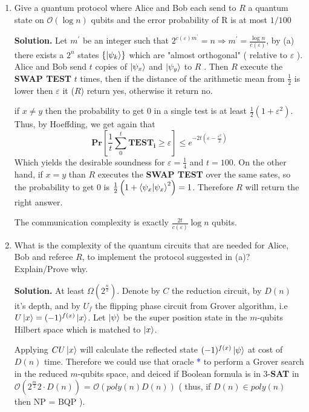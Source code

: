 \documentclass{article}
\newcommand{\onotation}[1]{\(\mathcal{O} \left( {#1}  \right) \)}
\newcommand{\ona}[1]{\onotation{#1}}
\begin{document}
\begin{enumerate}
    \item Give a quantum protocol where Alice and Bob each send to \(R\) a quantum state on \ona{ \log n}  qubits and the error probability of R is at most \( 1/100\) 
    
    
    \textbf{Solution.} Let \(m^\prime\) be an integer such that \( 2^{c(\varepsilon)m^\prime} = n \Rightarrow m^\prime = \frac{\log n}{c(\varepsilon)}\), by (a) there exists a \(2^n\) states \( \{ \ket{\psi_k} \} \) which are "almost orthogonal" ( relative to \(\varepsilon\) ). Alice and Bob send \(t\) copies of \( \ket{\psi_x} \) and \( \ket{\psi_y} \) to \(R\) . Then \(R\) execute the \textbf{SWAP TEST} \(t\) times, then if the distance of the arithmetic mean from \( \frac{1}{2} \) is lower then \(\varepsilon \) it (\(R\)) return yes, otherwise it return no.
    
    if \( x \neq y\) then the probability to get 0 in a single test is at least \( \frac{1}{2} \left( 1+ \varepsilon^2\right) \). Thus, by Hoeffding, we get again that \[ \mathbf{Pr} \left[ \frac{1}{t}\sum_{0}^{t}{ \mathbf{TEST_i} } \ge \varepsilon \right] \le e^{-2t\left( \varepsilon - \frac{\varepsilon^2}{2} \right)} \] Which yields the desirable soundness for \( \varepsilon = \frac{1}{4} \) and \( t = 100 \).   
    On the other hand, if \(x = y\) than \(R\) executes the \textbf{SWAP TEST} over the same sates, so the probability to get 0 is \(\frac{1}{2}\left(1 +  \braket{\psi_x | \psi_x}^2 \right) = 1\). Therefore \(R\) will return the right answer. 
    
    The communication complexity is exactly \( \frac{2t}{c(\varepsilon)}\log n\) qubits.
\item What is the complexity of the quantum circuits that are needed for Alice, Bob and referee \(R\), to implement the protocol suggested in (a)? Explain/Prove why.

\textbf{Solution.} At least \( \Omega(2^{\frac{n}{2}}) \). Denote by \( C \) the reduction circuit, by \(D(n)\) it's depth, and by \( U_f \) the flipping phase circuit from Grover algorithm, i.e \( U \ket{x} = (-1)^{f(x)} \ket{x}\). Let \( \ket{\psi}  \) be the super position state in the \(m\)-qubits Hilbert space which is matched to \( \ket{x} \).

Applying \( CU\ket{x} \) will calculate the reflected state \( (-1)^{f(x)} \ket{\psi} \) at cost of \( D(n) \) time. Therefore we could use that oracle \textcolor{blue}{*}  to perform a Grover search in the reduced \(m\)-qubits space, and deiced if Boolean formula is in 3-\textbf{SAT} in \ona{ 2^\frac{m}{2} 2\cdot D(n) } = \ona{ poly(n) D(n)} ( thus, if \( D(n) \in poly(n) \) then NP = BQP ).      


\end{enumerate}
\end{document}
